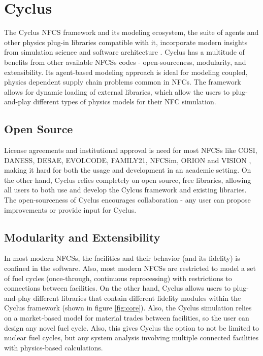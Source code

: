 \section{Cyclus}
The Cyclus \gls{NFCS} framework and its
modeling ecosystem, the suite of agents and other
physics plug-in libraries compatible with it, incorporate
modern insights from simulation science and software
architecture \cite{huff_fundamental_2016}. Cyclus
has a multitude of benefits from other available
\glspl{NFCS} codes - open-sourceness, modularity,
and extensibility. Its agent-based modeling approach
is ideal for modeling coupled, physics dependent
supply chain problems common in \glspl{NFC}.
The framework allows for dynamic loading of 
external libraries, which allow the users to plug-and-play
different types of physics models for their \gls{NFC}
simulation.

\subsection{Open Source}
License agreements and institutional
approval is need for most \glspl{NFCS} like COSI, DANESS, DESAE, EVOLCODE,
FAMILY21, NFCSim, ORION and VISION \cite{juchau_modeling_2017}, making
it hard for both the usage and development in an academic setting.
On the other hand, Cyclus relies completely on open source,
free libraries, allowing all users to both use and develop the
Cylcus framework and existing libraries. The open-sourceness
of Cyclus encourages collaboration - any user can propose
improvements or provide input for Cyclus.

\subsection{Modularity and Extensibility}
In most modern \glspl{NFCS}, the facilities and their
behavior (and its fidelity) is confined in the software.
Also, most modern \glspl{NFCS} are restricted to model
a set of fuel cycles (once-through, continuous reprocessing)
with restrictions to connections between facilities. On the
other hand, Cyclus allows users to plug-and-play different libraries
that contain different fidelity modules within the Cyclus framework
(shown in figure \ref{fig:core}).
Also, the Cyclus simulation relies on a market-based model
for material trades between facilities, so the user can design
any novel fuel cycle. Also, this gives Cyclus the option to not
be limited to nuclear fuel cycles, but any system analysis
involving multiple connected facilities with physics-based
calculations.



